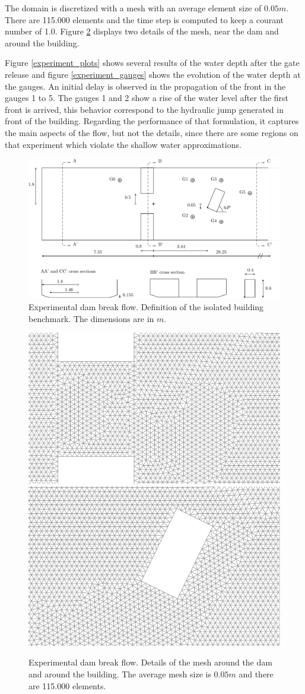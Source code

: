 \documentclass[a4paper,12pt]{article}
\begin{document}
The domain is discretized with a mesh with an average element size of $0.05m$. There are 115.000 elements and the time step is computed to keep a courant number of 1.0. Figure \ref{experiment_mesh} displays two details of the mesh, near the dam and around the building.

Figure \ref{experiment_plots} shows several results of the water depth after the gate release and figure \ref{experiment_gauges} shows the evolution of the water depth at the gauges. An initial delay is observed in the propagation of the front in the gauges 1 to 5.
The gauges 1 and 2 show a rise of the water level after the first front is arrived, this behavior correspond to the hydraulic jump generated in front of the building.
Regarding the performance of that formulation, it captures the main aspects of the flow, but not the details, since there are some regions on that experiment which violate the shallow water approximations.

\begin{figure}[H]
\centering
\includegraphics[width=\textwidth]{img/exp/sketch.pdf}
\caption{Experimental dam break flow. Definition of the isolated building benchmark. The dimensions are in $m$.}
\label{experiment_sketch}
\end{figure}


\begin{figure}[H]
\centering
\includegraphics[width=.49\textwidth]{img/exp/mesh_dam.png}
\hfill
\includegraphics[width=.47\textwidth]{img/exp/mesh_building.png}
\caption{Experimental dam break flow. Details of the mesh around the dam and around the building. The average mesh size is $0.05m$ and there are 115.000 elements.}
\label{experiment_mesh}
\end{figure}
\end{document}
